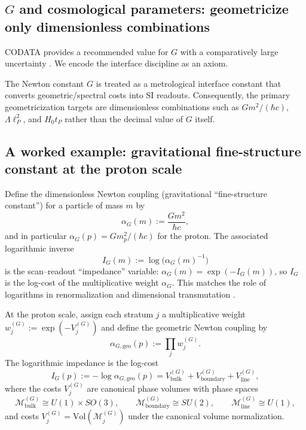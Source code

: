 \subsection{\texorpdfstring{$G$}{G} and cosmological parameters: geometricize only dimensionless combinations}
CODATA provides a recommended value for $G$ with a comparatively large uncertainty \cite{CODATA2022RMP}. We encode the interface discipline as an axiom.

\begin{axiom}\label{ax:G_interface}
The Newton constant $G$ is treated as a metrological interface constant that converts geometric/spectral costs into SI readouts. Consequently, the primary geometricization targets are dimensionless combinations such as $Gm^2/(\hbar c)$, $\Lambda\ell_P^2$, and $H_0 t_P$ rather than the decimal value of $G$ itself.
\end{axiom}

\subsection{A worked example: gravitational fine-structure constant at the proton scale}
Define the dimensionless Newton coupling (gravitational ``fine-structure constant'') for a particle of mass $m$ by
\begin{equation}\label{eq:alpha_G_def}
\alpha_G(m):=\frac{Gm^2}{\hbar c},
\end{equation}
and in particular $\alpha_G(p)=Gm_p^2/(\hbar c)$ for the proton. The associated logarithmic inverse
\begin{equation}\label{eq:I_G_def}
I_G(m):=\log\!\big(\alpha_G(m)^{-1}\big)
\end{equation}
is the scan--readout ``impedance'' variable: $\alpha_G(m)=\exp(-I_G(m))$, so $I_G$ is the log-cost of the multiplicative weight $\alpha_G$. This matches the role of logarithms in renormalization and dimensional transmutation \cite{PeskinSchroeder1995,PDGRPP2024}.

\begin{axiom}\label{ax:gravity_log_impedance}
At the proton scale, assign each stratum $j$ a multiplicative weight $w^{(G)}_j:=\exp(-V^{(G)}_j)$ and define the geometric Newton coupling by
\begin{equation}
\alpha_{G,\mathrm{geo}}(p):=\prod_{j} w^{(G)}_j.
\end{equation}
The logarithmic impedance is the log-cost
\begin{equation}
I_G(p):=-\log\alpha_{G,\mathrm{geo}}(p)=V^{(G)}_{\mathrm{bulk}}+V^{(G)}_{\mathrm{boundary}}+V^{(G)}_{\mathrm{line}},
\end{equation}
where the costs $V^{(G)}_j$ are canonical phase volumes with phase spaces
\begin{equation}
\mathcal{M}^{(G)}_{\mathrm{bulk}}\cong U(1)\times SO(3),\qquad
\mathcal{M}^{(G)}_{\mathrm{boundary}}\cong SU(2),\qquad
\mathcal{M}^{(G)}_{\mathrm{line}}\cong U(1),
\end{equation}
and costs $V^{(G)}_j=\mathrm{Vol}(\mathcal{M}^{(G)}_j)$ under the canonical volume normalization.
\end{axiom}

